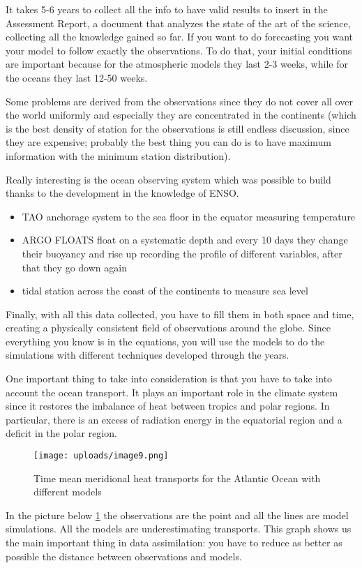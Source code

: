 It takes 5-6 years to collect all the info to have valid results to insert in the Assessment Report, a document that analyzes the state of the art of the science, collecting all the knowledge gained so far.
If you want to do forecasting you want your model to follow exactly the observations. To do that, your initial conditions are important because for the atmospheric models they last 2-3 weeks, while for the oceans they last 12-50 weeks.

Some problems are derived from the observations since they do not cover all over the world uniformly and especially they are concentrated in the continents (which is the best density of station for the observations is still endless discussion, since they are expensive; probably the best thing you can do is to have maximum information with the minimum station distribution).

Really interesting is the ocean observing system which was possible to build thanks to the development in the knowledge of ENSO.
\begin{itemize}
	\item TAO anchorage system to the sea floor in the equator measuring temperature
	\item  ARGO FLOATS float on a systematic depth and every 10 days they change their buoyancy and rise up recording the profile of different variables, after that they go down again
	\item tidal station across the coast of the continents to measure sea level
\end{itemize}

Finally, with all this data collected, you have to fill them in both space and time, creating a physically consistent field of observations around the globe. Since everything you know is in the equations, you will use the models to do the simulations with different techniques developed through the years.


One important thing to take into consideration is that you have to take into account the ocean transport. It plays an important role in the climate system since it restores the imbalance of heat between tropics and polar regions. In particular, there is an excess of radiation energy in the equatorial region and a deficit in the polar region.
\begin{figure}[htpb]
	\centering
	\texttt{[image: uploads/image9.png]}
	\caption{Time mean meridional heat transports for the Atlantic Ocean with different models}
	\label{fig:12}
\end{figure}
In the picture below \ref{fig:12} the observations are the point and all the lines are model simulations. All the models are underestimating transports.
This graph shows us the main important thing in data assimilation: you have to reduce as better as possible the distance between observations and models. \\






